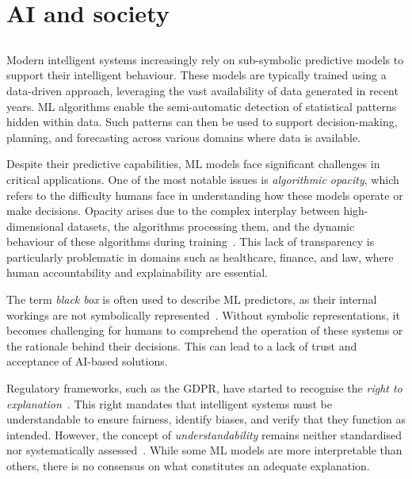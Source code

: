 
\section{AI and society}\label{sec:ai-and-society}
%
\subsection[Explainable AI]{}\label{subsec:xai}
%
Modern intelligent systems increasingly rely on sub-symbolic predictive models to support their intelligent behaviour.
%
These models are typically trained using a data-driven approach, leveraging the vast availability of data generated in recent years.
%
\Gls{ML} algorithms enable the semi-automatic detection of statistical patterns hidden within data.
%
Such patterns can then be used to support decision-making, planning, and forecasting across various domains where data is available.


Despite their predictive capabilities, \gls{ML} models face significant challenges in critical applications.
%
One of the most notable issues is \emph{algorithmic opacity}, which refers to the difficulty humans face in understanding how these models operate or make decisions.
%
Opacity arises due to the complex interplay between high-dimensional datasets, the algorithms processing them, and the dynamic behaviour of these algorithms during training~\cite{DBLP:journals/bigdatasociety/Burrell16}.
%
This lack of transparency is particularly problematic in domains such as healthcare, finance, and law, where human accountability and explainability are essential.


The term \emph{black box} is often used to describe \gls{ML} predictors, as their internal workings are not symbolically represented~\cite{interpretability-lipton-2018}.
%
Without symbolic representations, it becomes challenging for humans to comprehend the operation of these systems or the rationale behind their decisions.
%
This can lead to a lack of trust and acceptance of \gls{AI}-based solutions.


Regulatory frameworks, such as the \gls{GDPR}, have started to recognise the \emph{right to explanation}~\cite{DBLP:journals/aim/GoodmanF17}.
%
This right mandates that intelligent systems must be understandable to ensure fairness, identify biases, and verify that they function as intended.
%
However, the concept of \emph{understandability} remains neither standardised nor systematically assessed~\cite{DBLP:journals/ai/Miller19}.
%
While some \gls{ML} models are more interpretable than others, there is no consensus on what constitutes an adequate explanation.


